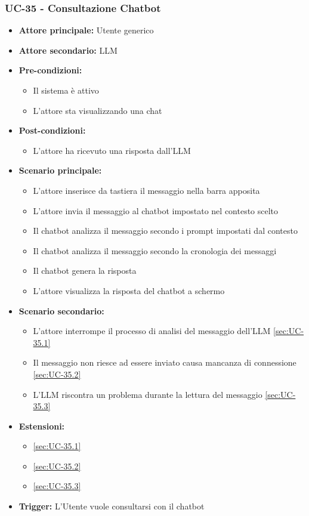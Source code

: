 \documentclass[a4paper,12pt]{article}
\begin{document}
\subsubsection{UC-35 - Consultazione Chatbot} \label{sec:UC-35}
\begin{itemize}
    \item \textbf{Attore principale:} Utente generico
    \item \textbf{Attore secondario:} LLM
    \item \textbf{Pre-condizioni:}
    \begin{itemize}
        \item Il sistema è attivo
        \item L'attore sta visualizzando una chat
    \end{itemize}
    \item \textbf{Post-condizioni:}
    \begin{itemize}
        \item L'attore ha ricevuto una risposta dall'LLM
    \end{itemize}
    \item \textbf{Scenario principale:} 
    \begin{itemize}
        \item L'attore inserisce da tastiera il messaggio nella barra apposita
        \item L'attore invia il messaggio al chatbot impostato nel contesto scelto
        \item Il chatbot analizza il messaggio secondo i prompt impostati dal contesto
        \item Il chatbot analizza il messaggio secondo la cronologia dei messaggi
        \item Il chatbot genera la risposta
        \item L'attore visualizza la risposta del chatbot a schermo
    \end{itemize}
    \item \textbf{Scenario secondario:} 
    \begin{itemize}
        \item L'attore interrompe il processo di analisi del messaggio dell'LLM \ref{sec:UC-35.1}
        \item Il messaggio non riesce ad essere inviato causa mancanza di connessione \ref{sec:UC-35.2}
        \item L'LLM riscontra un problema durante la lettura del messaggio \ref{sec:UC-35.3}
    \end{itemize}
    \item \textbf{Estensioni:}
    \begin{itemize}
        \item \ref{sec:UC-35.1}
        \item \ref{sec:UC-35.2}
        \item \ref{sec:UC-35.3}
    \end{itemize}
    \item \textbf{Trigger:} L'Utente vuole consultarsi con il chatbot
\end{itemize}
\end{document}
